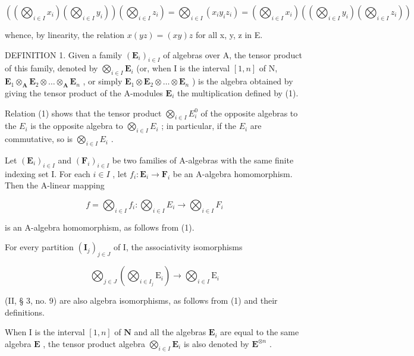 \[
\left(\left(\bigotimes_ {i \in I} x _ {i}\right) \left(\bigotimes_ {i \in I} y _ {i}\right)\right) \left(\bigotimes_ {i \in I} z _ {i}\right) = \bigotimes_ {i \in I} \left(x _ {i} y _ {i} z _ {i}\right) = \left(\bigotimes_ {i \in I} x _ {i}\right) \left(\left(\bigotimes_ {i \in I} y _ {i}\right) \left(\bigotimes_ {i \in I} z _ {i}\right)\right)
\]

whence, by linearity, the relation \(x(yz) = (xy)z\) for all x, y, z in E.

DEFINITION 1. Given a family \((\mathbf{E}_i)_{i\in I}\) of algebras over A, the tensor product of this family, denoted by \(\bigotimes_{i\in I}\mathbf{E}_i\) (or, when I is the interval \([1,n]\) of N, \(\mathbf{E}_1\otimes_\mathbf{A}\mathbf{E}_2\otimes \dots \otimes_\mathbf{A}\mathbf{E}_n\) , or simply \(\mathbf{E}_1\otimes \mathbf{E}_2\otimes \dots \otimes \mathbf{E}_n\) ) is the algebra obtained by giving the tensor product of the A-modules \(\mathbf{E}_i\) the multiplication defined by (1).

Relation (1) shows that the tensor product \(\bigotimes_{i\in I}E_i^0\) of the opposite algebras to the \(E_{i}\) is the opposite algebra to \(\bigotimes_{i\in I}E_{i}\) ; in particular, if the \(E_{i}\) are commutative, so is \(\bigotimes_{i\in I}E_{i}\) .

Let \((\mathbf{E}_i)_{i\in I}\) and \((\mathbf{F}_i)_{i\in I}\) be two families of A-algebras with the same finite indexing set I. For each \(i\in I\) , let \(f_{i}\colon \mathbf{E}_{i}\to \mathbf{F}_{i}\) be an A-algebra homomorphism. Then the A-linear mapping

\[
f = \bigotimes_ {i \in I} f _ {i}: \bigotimes_ {i \in I} E _ {i} \rightarrow \bigotimes_ {i \in I} F _ {i}
\]

is an A-algebra homomorphism, as follows from (1).

For every partition \((\mathbf{I}_{j})_{j\in J}\) of I, the associativity isomorphisms

\[
\bigotimes_ {j \in J} \left(\bigotimes_ {i \in I _ {j}} \mathrm{E} _ {i}\right)\rightarrow \bigotimes_ {i \in I} \mathrm{E} _ {i}
\]

(II, § 3, no. 9) are also algebra isomorphisms, as follows from (1) and their definitions.

When I is the interval \([1, n]\) of \(\mathbf{N}\) and all the algebras \(\mathbf{E}_i\) are equal to the same algebra \(\mathbf{E}\) , the tensor product algebra \(\bigotimes_{i \in I} \mathbf{E}_i\) is also denoted by \(\mathbf{E}^{\otimes n}\) .

